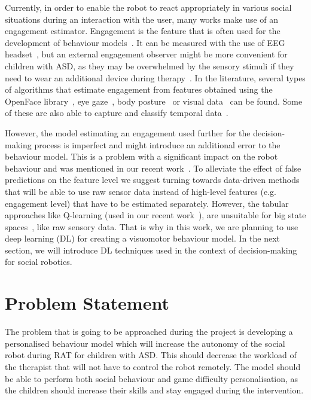 \documentclass[thesis]{mas_proposal}
\begin{document}
Currently, in order to enable the robot to react appropriately in various social situations during an interaction with the user, many works make use of an engagement estimator. Engagement is the feature that is often used for the development of behaviour models~\cite{senft2015sparc,senft2015human,tsiakas2018task,del2022learning}. It can be measured with the use of EEG headset~\cite{tsiakas2018task}, but an external engagement observer might be more convenient for children with ASD, as they may be overwhelmed by the sensory stimuli if they need to wear an additional device during therapy~\cite{javed2019robotic}. In the literature, several types of algorithms that estimate engagement from features obtained using the OpenFace library~\cite{baltrusaitis2018openface, jain2020modeling, kaur2019domain, karimah2021implementation}, eye gaze~\cite{khorrami2014system},  body posture~\cite{ritschel2017adapting} or visual data~\cite{mane2018engagement, del2020you} can be found. Some of these are also able to capture and classify temporal data~\cite{del2020you, karimah2021implementation}.

However, the model estimating an engagement used further for the decision-making process is imperfect and might introduce an additional error to the behaviour model. This is a problem with a significant impact on the robot behaviour and was mentioned in our recent work~\cite{stolarz2022learningbased}. To alleviate the effect of false predictions on the feature level we suggest turning towards data-driven methods that will be able to use raw sensor data instead of high-level features (e.g. engagement level) that have to be estimated separately. However, the tabular approaches like Q-learning (used in our recent work~\cite{stolarz2022learningbased}), are unsuitable for big state spaces~\cite{akalin2021reinforcement}, like raw sensory data. That is why in this work, we are planning to use deep learning (DL) for creating a visuomotor behaviour model. In the next section, we will introduce DL techniques used in the context of decision-making for social robotics.

\section{Problem Statement}
\label{sec:problem_statement}

The problem that is going to be approached during the project is developing a personalised behaviour model which will increase the autonomy of the social robot during RAT for children with ASD. This should decrease the workload of the therapist that will not have to control the robot remotely. The model should be able to perform both social behaviour and game difficulty personalisation, as the children should increase their skills and stay engaged during the intervention.
\end{document}
